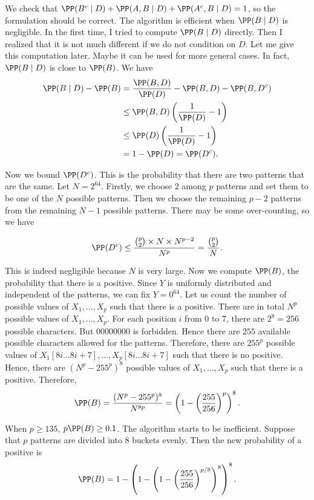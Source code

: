 We check that $\PP(B^c\mid D)+\PP(A,B\mid D)+\PP(A^c,B\mid D)=1$, so the formulation should be correct. The algorithm is efficient when $\PP(B\mid D)$ is negligible. In the first time, I tried to compute $\PP(B\mid D)$ directly. Then I realized that it is not much different if we do not condition on $D$. Let me give this computation later. Maybe it can be used for more general cases. In fact, $\PP(B\mid D)$ is close to $\PP(B)$. We have
\begin{align*}
  \PP(B\mid D) - \PP(B)
   & = \dfrac{\PP(B,D)}{\PP(D)} - \PP(B,D) - \PP(B,D^c) \\
   & \le \PP(B,D)\left(\dfrac{1}{\PP(D)}-1\right)       \\
   & \le \PP(D)\left(\dfrac{1}{\PP(D)}-1\right)         \\
   & = 1-\PP(D) = \PP(D^c).
\end{align*}

Now we bound $\PP(D^c)$. This is the probability that there are two patterns that are the same. Let $N=2^{64}$. Firstly, we choose $2$ among $p$ patterns and set them to be one of the $N$ possible patterns. Then we choose the remaining $p-2$ patterns from the remaining $N-1$ possible patterns. There may be some over-counting, so we have

$$\PP(D^c)\le \dfrac{\binom{p}{2}\times N\times N^{p-2}}{N^p} = \dfrac{\binom{p}{2}}{N}.$$

This is indeed negligible because $N$ is very large. Now we compute $\PP(B)$, the probability that there is a positive. Since $Y$ is uniformly distributed and independent of the patterns, we can fix $Y=0^{64}$. Let us count the number of possible values of $X_1,\ldots,X_p$ such that there is a positive. There are in total $N^p$ possible values of $X_1,\ldots,X_p$. For each position $i$ from $0$ to $7$, there are $2^8=256$ possible characters. But $00000000$ is forbidden. Hence there are $255$ available possible characters allowed for the patterns. Therefore, there are $255^p$ possible values of $X_1[8i\ldots 8i+7],\ldots,X_p[8i\ldots 8i+7]$ such that there is no positive. Hence, there are $(N^p-255^p)^8$ possible values of $X_1,\ldots,X_p$ such that there is a positive. Therefore,
$$\PP(B) = \dfrac{(N^p-255^p)^8}{N^{8p}} = \left(1-\left(\dfrac{255}{256}\right)^p\right)^8.$$

When $p\ge 135$, $p\PP(B)\ge 0.1$. The algorithm starts to be inefficient. Suppose that $p$ patterns are divided into $8$ buckets evenly. Then the new probability of a positive is
$$\PP(B)=1-\left(1-\left(1-\left(\dfrac{255}{256}\right)^{p/8}\right)^8\right)^8.$$

